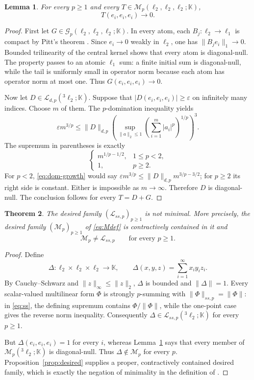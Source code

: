 \documentclass[11pt]{amsart}
\newtheorem{theorem}{Theorem}
\newtheorem{lemma}[theorem]{Lemma}
\newcommand{\K}{\mathbb K}
\newcommand{\Lcal}{\mathcal L}
\newcommand{\Gcal}{\mathcal G}
\newcommand{\Mcal}{\mathcal M}
\newcommand{\eps}{\varepsilon}
\begin{document}
\begin{lemma}\label{lem:diagonal-null}
For every $p\geq1$ and every
$T\in\Mcal_p(\ell_2,\ell_2,\ell_2;\K)$,
\[
 T(e_i,e_i,e_i)\longrightarrow0.
\]
\end{lemma}

\begin{proof}
First let $G\in\Gcal_p(\ell_2,\ell_2,\ell_2;\K)$.  In every atom, each
$B_j:\ell_2\to\ell_1$ is compact by Pitt's theorem \cite{Pitt}.  Since
$e_i\to0$ weakly in $\ell_2$, one has $\|B_je_i\|_1\to0$.  Bounded
trilinearity of the central kernel shows that every atom is diagonal-null.
The property passes to an atomic $\ell_1$ sum: a finite initial sum is
diagonal-null, while the tail is uniformly small in operator norm because
each atom has operator norm at most one.  Thus
$G(e_i,e_i,e_i)\to0$.

Now let $D\in\Lcal_{d,p}({}^3\ell_2;\K)$.  Suppose that
$|D(e_i,e_i,e_i)|\geq\eps$ on infinitely many indices.  Choose $m$ of them.
The $p$-domination inequality yields
\begin{equation}\label{eq:dom-growth}
 \eps m^{3/p}
 \leq \|D\|_{d,p}
 \left(\sup_{\|a\|_2\leq1}
       \left(\sum_{i=1}^m|a_i|^p\right)^{1/p}\right)^3.
\end{equation}
The supremum in parentheses is exactly
\[
 \begin{cases}
 m^{1/p-1/2},&1\leq p<2,\\
 1,&p\geq2.
 \end{cases}
\]
For $p<2$, \eqref{eq:dom-growth} would say
$\eps m^{3/p}\leq\|D\|_{d,p}m^{3/p-3/2}$; for $p\geq2$ its right side is
constant.  Either is impossible as $m\to\infty$.  Therefore $D$ is
diagonal-null.  The conclusion follows for every $T=D+G$.
\end{proof}

\begin{theorem}\label{thm:main}
The desired family $(\Lcal_{ss,p})_{p\geq1}$ is not minimal.
More precisely, the desired family $(\Mcal_p)_{p\geq1}$ of
\eqref{eq:Mdef} is contractively contained in it and
\[
 \Mcal_p\ne\Lcal_{ss,p}\qquad\text{for every }p\geq1.
\]
\end{theorem}

\begin{proof}
Define
\[
 \Delta:\ell_2\times\ell_2\times\ell_2\longrightarrow\K,
 \qquad
 \Delta(x,y,z)=\sum_{i=1}^{\infty}x_i y_i z_i.
\]
By Cauchy--Schwarz and $\|z\|_\infty\leq\|z\|_2$,
$\Delta$ is bounded and $\|\Delta\|=1$.  Every scalar-valued multilinear form
$\Phi$ is strongly $p$-summing with
$\|\Phi\|_{ss,p}=\|\Phi\|$: in \eqref{eq:ss}, the defining supremum contains
$\Phi/\|\Phi\|$, while the one-point case gives the reverse norm inequality.
Consequently $\Delta\in\Lcal_{ss,p}({}^3\ell_2;\K)$ for every $p\geq1$.

But $\Delta(e_i,e_i,e_i)=1$ for every $i$, whereas
Lemma~\ref{lem:diagonal-null} says that every member of
$\Mcal_p({}^3\ell_2;\K)$ is diagonal-null.  Thus
$\Delta\notin\Mcal_p$ for every $p$.  Proposition~\ref{prop:desired} supplies
a proper, contractively contained desired family, which is exactly the
negation of minimality in the definition of \cite{PS}.
\end{proof}
\end{document}
